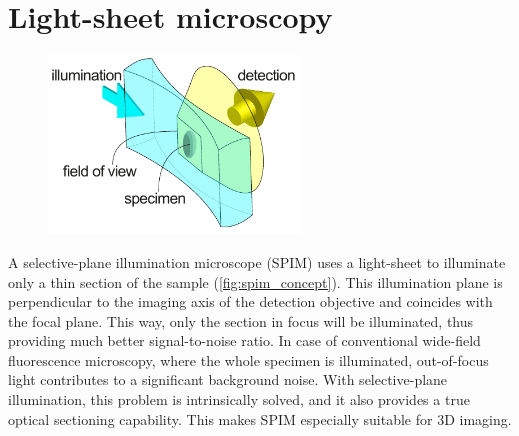     




\section{Light-sheet microscopy}
  \label{sec:light-sheet}
  \begin{figure}[bt]
    \centering
    \includegraphics[width=0.6\textwidth]{spim_concept}
    \label{fig:spim_concept}
  \end{figure}

  A selective-plane illumination microscope (SPIM) uses a light-sheet to illuminate only a thin section of the sample (\autoref{fig:spim_concept}). This illumination plane is perpendicular to the imaging axis of the detection objective and coincides with the focal plane. This way, only the section in focus will be illuminated, thus providing much better signal-to-noise ratio. In case of conventional wide-field fluorescence microscopy, where the whole specimen is illuminated, out-of-focus light contributes to a significant background noise. 
  With selective-plane illumination, this problem is intrinsically solved, and it also provides a true optical sectioning capability. This makes SPIM especially suitable for 3D imaging.


